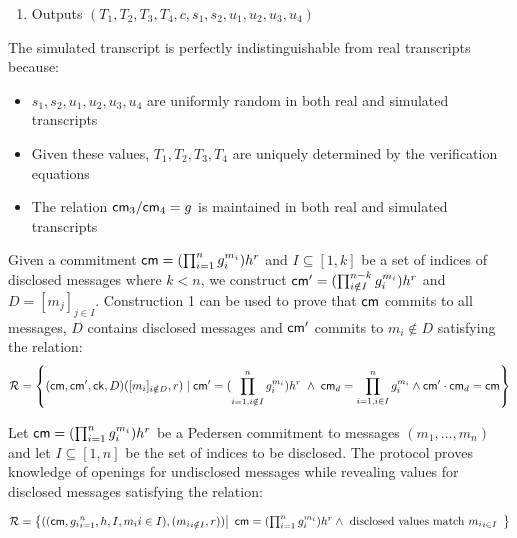 {\begin{enumerate}
    \item Outputs $(T_1,T_2,T_3,T_4,c,s_1,s_2,u_1,u_2,u_3,u_4)$
\end{enumerate}

\noindent The simulated transcript is perfectly indistinguishable from real transcripts because:
\begin{itemize}
    \item $s_1,s_2,u_1,u_2,u_3,u_4$ are uniformly random in both real and simulated transcripts
    \item Given these values, $T_1,T_2,T_3,T_4$ are uniquely determined by the verification equations
    \item The relation $\mathsf{cm}_3/\mathsf{cm}_4 = g$ is maintained in both real and simulated transcripts
\end{itemize}


\begin{corollary}
Given a commitment $\mathsf{cm} = (\prod_{i=1}^ng_i^{m_i})h^r$ and $I \subseteq [1,k]$ be a set of indices of disclosed messages where $k < n$, we construct $\mathsf{cm}' = (\prod_{i \notin I}^{n-k}g_i^{m_i})h^r $ and $D = [m_j]_{j\in I}$. Construction 1 can be used to prove that $\mathsf{cm}$ commits to all messages, $D$ contains disclosed messages and $\mathsf{cm}'$ commits to $m_i \notin D$ satisfying the relation:
\[
    \mathcal{R} = \left\{(\mathsf{cm}, \mathsf{cm}', \mathsf{ck}, D)([m_i]_{i\notin D}, r) \; |  \; \mathsf{cm}' = (\prod_{i=1, i \notin I}^n g_i^{m_i})h^r \; \wedge \; \mathsf{cm}_d = \prod_{i=1, i \in I}^n g_i^{m_i} \wedge \mathsf{cm}' \cdot \mathsf{cm}_d = \mathsf{cm}
    \right\}
\]
\end{corollary}

\begin{corollary}
Let $\mathsf{cm} = (\prod_{i=1}^n g_i^{m_i})h^r$ be a Pedersen commitment to messages $(m_1,\ldots,m_n)$ and let $I \subseteq [1,n]$ be the set of indices to be disclosed. The protocol proves knowledge of openings for undisclosed messages while revealing values for disclosed messages satisfying the relation:

\[
\mathcal{R} = \left\{ ((\mathsf{cm}, {g_i}_{i=1}^n, h, I, {m_i}{i \in I}), ({m_i}_{i \notin I}, r)) \middle|
\begin{array}{l}
\mathsf{cm} = (\prod_{i=1}^n g_i^{m_i})h^r \wedge \
\text{disclosed values match } {m_i}_{i \in I}
\end{array} \right\}
\]


\end{corollary}




}
